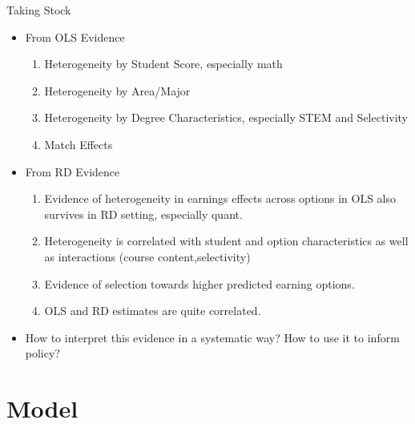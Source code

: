 \documentclass[table,10pt]{beamer}
\begin{document}
\begin{frame}{Taking Stock}

\begin{itemize}
  \item From OLS Evidence

\begin{enumerate}
  \item<1> Heterogeneity by Student Score, especially math
  \item<1> Heterogeneity by Area/Major
  \item<1> Heterogeneity by Degree Characteristics, especially STEM and Selectivity
  \item<1> Match Effects
\end{enumerate}

\item From RD Evidence
\begin{enumerate}
  \item<1> Evidence of heterogeneity in earnings effects across options in OLS also survives in RD setting, especially quant. 
   
  \item<2> Heterogeneity is correlated with student and option characteristics as well as interactions (course content,selectivity) 
  
  \item<3> Evidence of selection towards higher predicted earning options.
  
  \item<4> OLS and RD estimates are quite correlated.  
\end{enumerate}

\item<5> How to interpret this evidence in a systematic way? How to use it to inform policy? 

\end{itemize}
\end{frame}

\section{Model}
\end{document}
